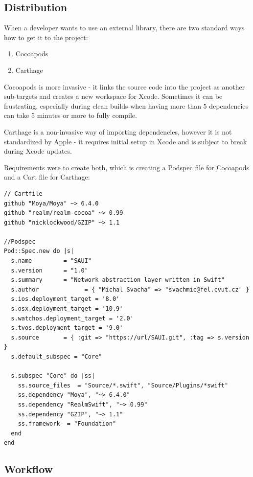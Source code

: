 \subsection{Distribution}

When a developer wants to use an external library, there are two standard ways how to get it to the project:

\begin{enumerate}
	\item Cocoapods
	\item Carthage
\end{enumerate}

Cocoapods is more invasive - it links the source code into the project as another sub-targets and creates a new workspace for Xcode. Sometimes it can be frustrating, especially during clean builds when having more than 5 dependencies can take 5 minutes or more to fully compile.

Carthage is a non-invasive way of importing dependencies, however it is not standardized by Apple - it requires initial setup in Xcode and is subject to break during Xcode updates.

\bigbreak

Requirements were to create both, which is creating a Podspec file for Cocoapods and a Cart file for Carthage:

\begin{lstlisting}
// Cartfile
github "Moya/Moya" ~> 6.4.0
github "realm/realm-cocoa" ~> 0.99
github "nicklockwood/GZIP" ~> 1.1

//Podspec
Pod::Spec.new do |s|
  s.name         = "SAUI"
  s.version      = "1.0"
  s.summary      = "Network abstraction layer written in Swift"
  s.author             = { "Michal Svacha" => "svachmic@fel.cvut.cz" }
  s.ios.deployment_target = '8.0'
  s.osx.deployment_target = '10.9'
  s.watchos.deployment_target = '2.0'
  s.tvos.deployment_target = '9.0'
  s.source       = { :git => "https://url/SAUI.git", :tag => s.version }
  s.default_subspec = "Core"

  s.subspec "Core" do |ss|
    ss.source_files  = "Source/*.swift", "Source/Plugins/*swift"
    ss.dependency "Moya", "~> 6.4.0"
    ss.dependency "RealmSwift", "~> 0.99"
    ss.dependency "GZIP", "~> 1.1"
    ss.framework  = "Foundation"
  end
end

\end{lstlisting}	

\newpage

\subsection{Workflow}

